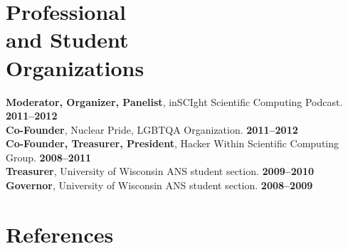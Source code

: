 \documentclass[margin,line]{resume}
\begin{document}
\begin{resume}
    \section{\mysidestyle Professional\\and Student\\Organizations} 
		\textbf{Moderator, Organizer, Panelist}, inSCIght Scientific Computing Podcast. \hfill \textbf{2011--2012}\vspace{.5mm}\\%
		\textbf{Co-Founder}, Nuclear Pride, LGBTQA Organization. \hfill \textbf{2011--2012}\vspace{.5mm}\\%
		\textbf{Co-Founder, Treasurer, President}, Hacker Within Scientific Computing Group. \hfill \textbf{2008--2011}\vspace{.5mm}\\%
		\textbf{Treasurer}, University of Wisconsin ANS student section. \hfill \textbf{2009--2010}\vspace{.5mm}\\%
		\textbf{Governor}, University of Wisconsin ANS student section. \hfill \textbf{2008--2009}\vspace{.5mm}\\\vspace{-2mm}%

\section{\mysidestyle References} 
  

\end{resume}
\end{document}
